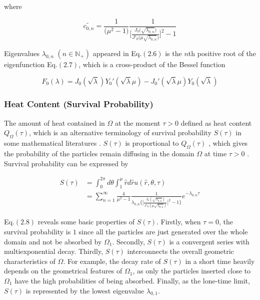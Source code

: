 where

$$\tilde{c_{0,n}} = \frac{1}{\big(\mu^2 - 1\big)}
\frac{1}{\bigg[\frac{J_0\big(\sqrt{\lambda_{0,n}}\big)}{J'_0\big(\mu
      \sqrt{\lambda_{0,n}}\big)}\bigg]^2 -1}$$


Eigenvalues $\lambda_{0, n}$ $(n \in \mathbb{N}_{+})$ appeared in
Eq.$(2.6)$ is the $n$th positive root of the eigenfunction Eq.$(2.7)$,
which is a cross-product of the Bessel function
\cite{watson1995treatise}

\begin{equation}
  F_0(\lambda) = J_0(\sqrt{\lambda}) Y_0'(\sqrt{\lambda} \mu) -
  J_0'(\sqrt{\lambda} \mu) Y_0(\sqrt{\lambda})
\end{equation}


\subsubsection{Heat Content (Survival Probability)}

The amount of heat contained in $\Omega$ at the moment $\tau > 0$
defined as heat content $Q_{\Omega}(\tau)$, which is an alternative
terminology of survival probability $S(\tau)$ in some mathematical
literatures \cite{birkhoff1954note} \cite{van1994heat}
\cite{gilkey1994heat}. $S(\tau)$ is proportional to $Q_{\Omega}(\tau)$
\cite{kalinay2011survival}, which gives the probability of the
particles remain diffusing in the domain $\Omega$ at time $\tau > 0$
\cite{aalen2008survival}. Survival probability can be expressed by

\begin{equation}
  \begin{split}
    S(\tau) &= \int_{0}^{2\pi} d\theta \int_{1}^{\mu} \hat r d \hat r
    u(\hat r, \theta, \tau)\\ &= \sum_{n=1}^{\infty} \frac{4}{\mu^2 -
      1} \frac{1}{\lambda_{0,n}
      \bigg\{\bigg[\frac{J_0(\sqrt{\lambda_{0,n}})}{J'_0(\mu
          \sqrt{\lambda_{0,n}})}\bigg]^2 -1\bigg\}} e^{-\lambda_{0, n}
      \tau}
  \end{split}
\end{equation}

Eq.$(2.8)$ reveals some basic properties of $S(\tau)$. Firstly, when
$\tau=0$, the survival probability is $1$ since all the particles are
just generated over the whole domain and not be absorbed by
$\Omega_1$. Secondly, $S(\tau)$ is a convergent series with
multiexponential decay. Thirdly, $S(\tau)$ interconnects the overall
geometric characteristics of $\Omega$. For example, the decay rate of
$S(\tau)$ in a short time heavily depends on the geometrical features
of $\Omega_1$, as only the particles inserted close to $\Omega_1$ have
the high probabilities of being absorbed. Finally, as the lone-time
limit, $S(\tau)$ is represented by the lowest eigenvalue
$\lambda_{0,1}$.



